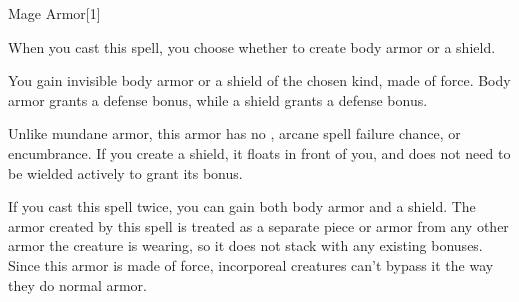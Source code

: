 
\begin{spellsection}{Mage Armor}[1]
    \begin{spellheader}
    \end{spellheader}
    \begin{spellcontent}
        \begin{spelltargetinginfo}
            \spellspecial When you cast this spell, you choose whether to create body armor or a shield.
        \end{spelltargetinginfo}
        \begin{spelleffects}
            \spelleffect You gain invisible body armor or a shield of the chosen kind, made of force. Body armor grants a  defense bonus, while a shield grants a  defense bonus.
            \par Unlike mundane armor, this armor has no , arcane spell failure chance, or encumbrance. If you create a shield, it floats in front of you, and does not need to be wielded actively to grant its bonus.
            \spelldur \durlong
        \end{spelleffects}
    \end{spellcontent}
    \begin{spellfooter}
        \spellnotes If you cast this spell twice, you can gain both body armor and a shield. The armor created by this spell is treated as a separate piece or armor from any other armor the creature is wearing, so it does not stack with any existing bonuses. Since this armor is made of force, incorporeal creatures can't bypass it the way they do normal armor.
        \miscastexplode
    \end{spellfooter}
    \begin{spellaugments}
    \end{spellaugments}
\end{spellsection}

